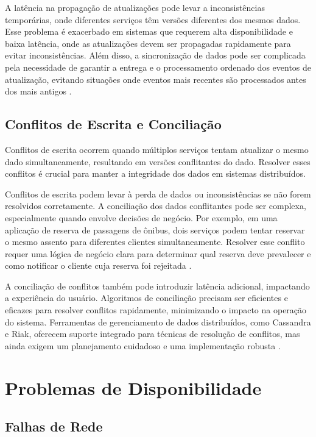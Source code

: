 A latência na propagação de atualizações pode levar a inconsistências temporárias, onde diferentes serviços têm versões diferentes dos mesmos dados. Esse problema é exacerbado em sistemas que requerem alta disponibilidade e baixa latência, onde as atualizações devem ser propagadas rapidamente para evitar inconsistências. Além disso, a sincronização de dados pode ser complicada pela necessidade de garantir a entrega e o processamento ordenado dos eventos de atualização, evitando situações onde eventos mais recentes são processados antes dos mais antigos \cite{pritchett2008}.

\subsection{Conflitos de Escrita e Conciliação}

Conflitos de escrita ocorrem quando múltiplos serviços tentam atualizar o mesmo dado simultaneamente, resultando em versões conflitantes do dado. Resolver esses conflitos é crucial para manter a integridade dos dados em sistemas distribuídos.

Conflitos de escrita podem levar à perda de dados ou inconsistências se não forem resolvidos corretamente. A conciliação dos dados conflitantes pode ser complexa, especialmente quando envolve decisões de negócio. Por exemplo, em uma aplicação de reserva de passagens de ônibus, dois serviços podem tentar reservar o mesmo assento para diferentes clientes simultaneamente. Resolver esse conflito requer uma lógica de negócio clara para determinar qual reserva deve prevalecer e como notificar o cliente cuja reserva foi rejeitada \cite{vogels2009}.

A conciliação de conflitos também pode introduzir latência adicional, impactando a experiência do usuário. Algoritmos de conciliação precisam ser eficientes e eficazes para resolver conflitos rapidamente, minimizando o impacto na operação do sistema. Ferramentas de gerenciamento de dados distribuídos, como Cassandra e Riak, oferecem suporte integrado para técnicas de resolução de conflitos, mas ainda exigem um planejamento cuidadoso e uma implementação robusta \cite{lakshman2010}.

\section{Problemas de Disponibilidade}

\subsection{Falhas de Rede}

